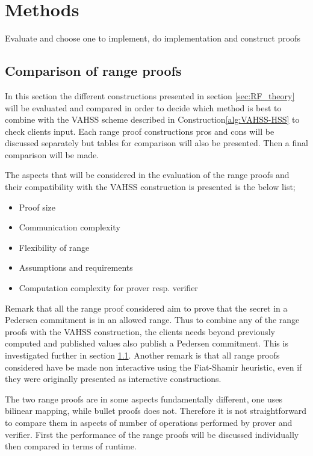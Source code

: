 \chapter{Methods}
\label{sec:Methods}
Evaluate and choose one to implement, do implementation and construct proofs

\section{Comparison of range proofs}
In this section the different constructions presented in section \ref{sec:RF_theory} will be evaluated and compared in order to decide which method is best to combine with the VAHSS scheme described in Construction\ref{alg:VAHSS-HSS} to check clients input. Each range proof constructions pros and cons will be discussed separately but tables for comparison will also be presented. Then a final comparison will be made.

The aspects that will be considered in the evaluation of the range proofs and their compatibility with the VAHSS construction is presented is the below list;
\begin{itemize}
    \item Proof size
    \item Communication complexity
    \item Flexibility of range
    \item Assumptions and requirements 
    \item Computation complexity for prover resp. verifier
\end{itemize}

Remark that all the range proof considered aim to prove that the secret in a Pedersen commitment is in an allowed range. Thus to combine any of the range proofs with the VAHSS construction, the clients needs beyond previously computed and published values also publish a Pedersen commitment. This is investigated further in section \ref{}. Another remark is that all range proofs considered have be made non interactive using the Fiat-Shamir heuristic, even if they were originally presented as interactive constructions. 


The two range proofs are in some aspects fundamentally different, one uses bilinear mapping,  while bullet proofs does not. Therefore it is not straightforward to compare them in aspects of number of operations performed by prover and verifier. First the performance of the range proofs will be discussed individually then compared in terms of runtime. 

